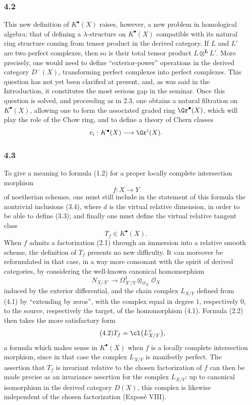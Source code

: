 \subsubsection*{4.2}
This new definition of $K^\bullet(X)$ raises, however, a new problem in homological algebra: that of defining a $\lambda$-structure on $K^\bullet(X)$ compatible with its natural ring structure coming from tensor product in the derived category. If $L$ and $L'$ are two perfect complexes, then so is their total tensor product $L\otimes^{\mathbf L}L'$. More precisely, one would need to define ``exterior-power'' operations in the derived category $D^-(X)$, transforming perfect complexes into perfect complexes. This question has not yet been clarified at present, and, as was said in the Introduction, it constitutes the most serious gap in the seminar. Once this question is solved, and proceeding as in 2.3, one obtains a natural filtration on $K^\bullet(X)$, allowing one to form the associated graded ring $\Gr^\bullet(X)$, which will play the role of the Chow ring, and to define a theory of Chern classes
\[
c_i:K^\bullet(X)\longrightarrow \Gr^i(X).
\]

\subsubsection*{4.3}
To give a meaning to formula (1.2) for a proper locally complete intersection morphism
\[
f:X\longrightarrow Y
\]
of noetherian schemes, one must still include in the statement of this formula the nontrivial inclusions (3.4), where $d$ is the virtual relative dimension, in order to be able to define (3.3); and finally one must define the virtual relative tangent class
\[
T_f\in K^\bullet(X).
\]
When $f$ admits a factorization (2.1) through an immersion into a relative smooth scheme, the definition of $T_f$ presents no new difficulty. It can moreover be reformulated in that case, in a way more consonant with the spirit of derived categories, by considering the well-known canonical homomorphism
\begin{equation}\tag{4.1}
N_{X/X'}\longrightarrow \Omega^1_{X'/Y}\otimes_{\mathcal O_{X'}}\mathcal O_X
\end{equation}
induced by the exterior differential, and the chain complex $L_{X/Y}$ defined from (4.1) by ``extending by zeros'', with the complex equal in degree $1$, respectively $0$, to the source, respectively the target, of the homomorphism (4.1). Formula (2.2) then takes the more satisfactory form
\begin{equation}\tag{4.2}
T_f=\cl\bigl(L_{X/Y}^{\vee}\bigr),
\end{equation}
a formula which makes sense in $K^\bullet(X)$ when $f$ is a locally complete intersection morphism, since in that case the complex $L_{X/Y}$ is manifestly perfect. The assertion that $T_f$ is invariant relative to the chosen factorization of $f$ can then be made precise as an invariance assertion for the complex $L_{X/Y}$: up to canonical isomorphism in the derived category $D(X)$, this complex is likewise independent of the chosen factorization (Expos\'e VIII).

